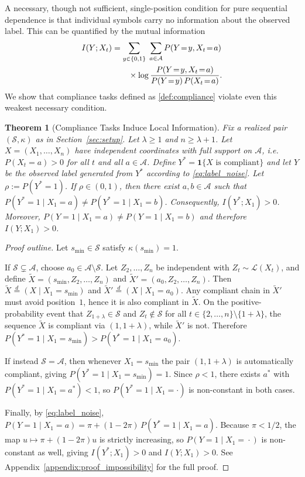 \documentclass{article}
\theoremstyle{plain}
\newtheorem{theorem}{Theorem}[section]
\theoremstyle{definition}
\theoremstyle{remark}
\begin{document}
A necessary, though not sufficient, single-position condition for pure sequential dependence is that individual symbols carry no information about the observed label. This can be quantified by the mutual information
\begin{align}
\label{eq:mutual_info}
I(Y;X_t)
&= \sum_{y\in\{0,1\}}\;\sum_{a\in\mathcal{A}}
P(Y\!=\!y,X_t\!=\!a) \notag\\
&\qquad\times\log
\frac{P(Y\!=\!y,X_t\!=\!a)}{P(Y\!=\!y)\,P(X_t\!=\!a)}.
\end{align}
We show that compliance tasks defined as \ref{def:compliance} violate even this weakest necessary condition.

\begin{theorem}[Compliance Tasks Induce Local Information]
\label{thm:impossibility}
Fix a realized pair $(\mathcal{S},\kappa)$ as in Section~\ref{sec:setup}.
Let $\lambda \ge 1$ and $n \ge \lambda+1$.
Let $X=(X_1,\ldots,X_n)$ have independent coordinates with full support on
$\mathcal{A}$, i.e.\ $P(X_t=a)>0$ for all $t$ and all $a\in\mathcal{A}$.
Define
$Y^* = \mathbf{1}\{X \text{ is compliant}\}$ and let $Y$ be the observed label generated from $Y^*$ according to
\eqref{eq:label_noise}. Let $\rho := P(Y^*=1)$.
If $\rho\in(0,1)$, then there exist $a,b\in\mathcal{A}$ such that $P(Y^*=1\mid X_1=a)\neq P(Y^*=1\mid X_1=b)$.
Consequently, $I(Y^*;X_1)>0$. Moreover, $P(Y=1\mid X_1=a)\neq P(Y=1\mid X_1=b)$ and therefore $I(Y;X_1)>0$.
\end{theorem}

\begin{proof}[Proof outline]
Let $s_{\min}\in\mathcal{S}$ satisfy $\kappa(s_{\min})=1$.

If $\mathcal{S}\subsetneq\mathcal{A}$, choose $a_0\in\mathcal{A}\setminus\mathcal{S}$.
Let $Z_2,\ldots,Z_n$ be independent with $Z_t\sim\mathcal{L}(X_t)$, and define $\widetilde X=(s_{\min},Z_2,\ldots,Z_n)$ and $\widetilde X'=(a_0,Z_2,\ldots,Z_n)$.
Then $\widetilde X \stackrel{d}{=} (X\mid X_1=s_{\min})$ and $\widetilde X' \stackrel{d}{=} (X\mid X_1=a_0)$. Any compliant chain in $\widetilde X'$ must avoid position~$1$, hence it is also compliant in $\widetilde X$. On the positive-probability event that $Z_{1+\lambda}\in\mathcal{S}$ and $Z_t\notin\mathcal{S}$ for all
$t\in\{2,\ldots,n\}\setminus\{1+\lambda\}$, the sequence $\widetilde X$ is compliant via $(1,1+\lambda)$,
while $\widetilde X'$ is not. Therefore $P(Y^*\!=\!1\mid X_1\!=\!s_{\min}) > P(Y^*\!=\!1\mid X_1\!=\!a_0)$.

If instead $\mathcal{S}=\mathcal{A}$, then whenever $X_1=s_{\min}$ the pair $(1,1+\lambda)$ is automatically compliant, giving $P(Y^*=1\mid X_1=s_{\min})=1$. Since $\rho<1$, there exists $a^*$ with $P(Y^*=1\mid X_1=a^*)<1$, so $P(Y^*=1\mid X_1=\cdot)$ is non-constant in both cases.

Finally, by \eqref{eq:label_noise}, $P(Y\!=\!1\mid X_1\!=\!a) = \pi + (1-2\pi)\,P(Y^*\!=\!1\mid X_1\!=\!a)$. Because $\pi<1/2$, the map $u\mapsto \pi+(1-2\pi)u$ is strictly increasing, so $P(Y\!=\!1\mid X_1\!=\!\cdot)$ is non-constant as well, giving $I(Y^*;X_1)>0$ and $I(Y;X_1)>0$. See Appendix~\ref{appendix:proof_impossibility} for the full proof.
\end{proof}
\end{document}

